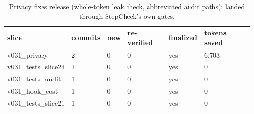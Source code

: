 \documentclass{article}
\begin{document}
\begin{table}[h]
\centering
\begin{tabular}{llllll}
\toprule
slice & commits & new & re-verified & finalized & tokens saved \\
\midrule
v031\_privacy & 2 & 0 & 0 & yes & 6,703 \\
v031\_tests\_slice24 & 1 & 0 & 0 & yes & 0 \\
v031\_tests\_audit & 1 & 0 & 0 & yes & 0 \\
v031\_hook\_cost & 1 & 0 & 0 & yes & 0 \\
v031\_tests\_slice21 & 1 & 0 & 0 & yes & 0 \\
\bottomrule
\end{tabular}
\caption{Privacy fixes release (whole-token leak check, abbreviated audit paths): landed through StepCheck's own gates.}
\label{tab:dogfoodv031}
\end{table}
\end{document}
